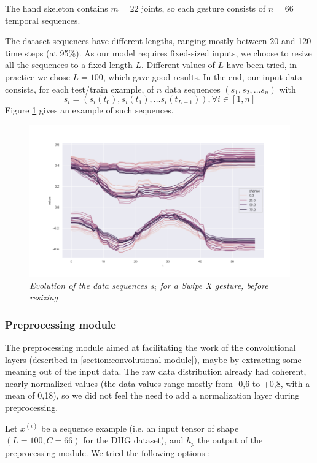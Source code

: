 \documentclass{article}
\begin{document}
The hand skeleton contains $m=22$ joints, so each gesture consists of $n=66$ temporal sequences.
\par
The dataset sequences have different lengths, ranging mostly between 20 and 120 time steps (at 95\%). As our model requires fixed-sized inputs, we choose to resize all the sequences to a fixed length $L$. Different values of $L$ have been tried, in practice we chose $L=100$, which gave good results.
In the end, our input data consists, for each test/train example, of $n$ data sequences $(s_1, s_2, \dots s_n)$ with
$$s_i = (s_i(t_0), s_i(t_1), \dots s_i(t_{L-1})), \forall i \in [1, n]$$
Figure \ref{fig:temporal-sequences} gives an example of such sequences.

\begin{figure}
    \centering
    \includegraphics[width=0.7 \linewidth]{img/time_sequence_swipeX.png}
    \caption{\textit{Evolution of the data sequences $s_i$ for a Swipe X gesture, before resizing}}
    \label{fig:temporal-sequences}
\end{figure}

\subsubsection{Preprocessing module} \label{section:preprocessing-module}
The preprocessing module aimed at facilitating the work of the convolutional layers (described in \ref{section:convolutional-module}), maybe by extracting some meaning out of the input data.
The raw data distribution already had coherent, nearly normalized values (the data values range mostly from -0,6 to +0,8, with a mean of 0,18), so we did not feel the need to add a normalization layer during preprocessing.
\par
Let $x^{(i)}$ be a sequence example (i.e. an input tensor of shape $(L=100, C=66)$ for the DHG dataset), and $h_p$ the output of the preprocessing module. We tried the following options :
\end{document}
